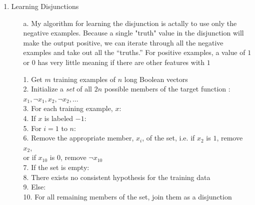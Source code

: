 
\usepackage{graphicx}

\oddsidemargin 0in
\evensidemargin 0in
\textwidth 6.5in
\topmargin -0.5in
\textheight 9.0in
\newcommand{\norm}[1]{\left\lVert #1 \right\rVert}



\pagestyle{myheadings}

\begin{enumerate}
\item Learning Disjunctions
      	\begin{enumerate}\parindent-4pt
		\item[a.]
			My algorithm for learning the disjunction is actally to use only the negative examples. Because a single "truth" value in the disjunction will make the output positive, we can iterate through all the negative examples and take out all the ``truths.'' For positive examples, a value of $1$ or $0$ has very little meaning if there are other features with $1$ 
			\begin{algorithm}
				1. Get $m$ training examples of $n$ long Boolean vectors\\
				2. Initialize a \textit{set} of all $2n$ possible members of the target function : $x_1, \neg x_1, x_2, \neg x_2, \ldots$ \\
				3. For each training example, $x$:\\
				4. \>\> If $x$ is labeled $-1$:\\
				5. \>\>\>	For $i=1$ to $n$:\\
				6. \>\>\>\>		Remove the appropriate member, $x_i$, of the set, i.e. if $x_2$ is $1$, remove $x_2$,\\ 
				   \>\>\>\>		or if $x_{10}$ is $0$, remove $\neg x_{10}$\\
				7. If the set is empty:\\
				8. \>\>	There exists no consistent hypothesis for the training data\\
				9. Else:\\
				10.\>\> For all remaining members of the set, join them as a disjunction\\
			\end{algorithm}
				

\end{enumerate}
\end{enumerate}
